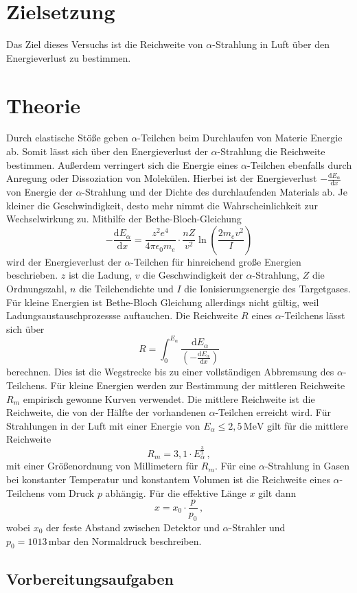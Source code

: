 \section{Zielsetzung}
\label{sec:Zielsetzung}
Das Ziel dieses Versuchs ist die Reichweite von $\alpha$-Strahlung in Luft über den Energieverlust zu bestimmen. 

\section{Theorie}
\label{sec:Theorie}
Durch elastische Stöße geben $\alpha$-Teilchen beim Durchlaufen von Materie Energie ab. Somit lässt sich über den Energieverlust der $\alpha$-Strahlung 
die Reichweite bestimmen.  Außerdem verringert sich die Energie eines $\alpha$-Teilchen ebenfalls durch Anregung oder Dissoziation von Molekülen. Hierbei 
ist der Energieverlust $-\frac{\text{d}E_{\alpha}}{\text{d}x}$ von Energie der $\alpha$-Strahlung und der Dichte des durchlaufenden Materials ab. Je kleiner 
die Geschwindigkeit, desto mehr nimmt die Wahrscheinlichkeit zur Wechselwirkung zu. Mithilfe der Bethe-Bloch-Gleichung
\begin{equation}
	-\frac{\text{d}E_{\alpha}}{\text{d}x} = \frac{z^2e^4}{4 \pi \epsilon_0 m_e} \cdot \frac{nZ}{v^2} \ln \left( \frac{2m_e v^2}{I} \right)
\label{eqn:Bethe-Bloch-Gleichung}
\end{equation}
wird der Energieverlust der $\alpha$-Teilchen für hinreichend große Energien beschrieben. $z$ ist die Ladung, $v$ die Geschwindigkeit der $\alpha$-Strahlung, 
$Z$ die Ordnungszahl, $n$ die Teilchendichte und $I$ die Ionisierungsenergie des Targetgases. Für kleine Energien ist Bethe-Bloch Gleichung allerdings nicht 
gültig, weil Ladungsaustauschprozessse auftauchen. Die Reichweite $R$ eines $\alpha$-Teilchens lässt sich über 
\begin{equation}
	R= \int_{0}^{E_{\alpha}} \frac{\text{d}E_{\alpha}}{\left(-\frac{\text{d}E_{\alpha}}{\text{d}x}\right)}
\label{eqn:Reichweite}
\end{equation}
berechnen. Dies ist die Wegstrecke bis zu einer vollständigen Abbremsung des $\alpha$-Teilchens.
Für kleine Energien werden zur Bestimmung der mittleren Reichweite $R_m$ empirisch gewonne Kurven verwendet. Die mittlere Reichweite ist die Reichweite, die 
von der Hälfte der vorhandenen $\alpha$-Teilchen erreicht wird. Für Strahlungen in der Luft mit einer Energie von $E_{\alpha}  \leq 2,5\,\unit{\mega\eV}$ gilt 
für die mittlere Reichweite 
\begin{equation}
R_m= 3,1\cdot E_{\alpha}^{\frac{3}{2}}\,,
\label{eqn:mittlere_Reichweite}
\end{equation}
mit einer Größenordnung von Millimetern für  $R_m$.
Für eine $\alpha$-Strahlung in Gasen bei konstanter Temperatur und konstantem Volumen ist die Reichweite eines $\alpha$-Teilchens  vom Druck $p$ abhängig. 
Für die effektive Länge $x$ gilt dann
\begin{equation}
x= x_0\cdot \frac{p}{p_0}\,,
\label{eqn:effektive_Laenge}
\end{equation}
wobei $x_0$ der feste Abstand zwischen Detektor und $\alpha$-Strahler und $p_0 = 1013\,\unit{\milli\bar}$ den Normaldruck beschreiben.

\subsection{Vorbereitungsaufgaben}
\label{sec:Vorbereitungsaufgaben}
